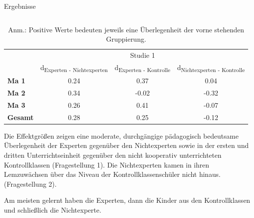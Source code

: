 \documentclass[final]{beamer}
\newlength{\onecolwid}
\newlength{\twocolwid}
\begin{document}
\begin{frame}[t]
\begin{columns}[t]
\begin{column}{\twocolwid}
\begin{block}{Ergebnisse}
\begin{columns}[t,totalwidth=\twocolwid] %
\begin{column}{\onecolwid} %
\begin{table}
\begin{tabular}{lccc}
 & \multicolumn{3}{c}{Studie 1} \\
\cmidrule{2-4}
 & d\textsubscript{Experten - Nichtexperten} & d\textsubscript{Experten - Kontrolle} & d\textsubscript{Nichtexperten - Kontrolle} \\
\midrule 
\textbf{Ma 1} & 0.24 & 0.37 & 0.04 \\
\textbf{Ma 2} & 0.34 & -0.02 & -0.32 \\
\textbf{Ma 3} & 0.26 & 0.41 & -0.07 \\
\midrule 
\textbf{Gesamt} & 0.28 & 0.25 & -0.12 \\
\bottomrule
\end{tabular}
{\caption*{Anm.: Positive Werte bedeuten jeweils eine Überlegenheit der vorne stehenden Gruppierung.}}
\end{table}

\justifying
Die Effektgrößen zeigen eine moderate, durchgängige pädagogisch bedeutsame Überlegenheit der Experten gegenüber den Nichtexperten sowie in der ersten und dritten Unterrichtseinheit gegenüber den nicht kooperativ unterrichteten Kontrollklassen (Fragestellung 1). Die Nichtexperten kamen in ihren Lemzuwächsen über das Niveau der Kontrollklassenschüler nicht hinaus. (Fragestellung 2). 

Am meisten gelernt haben die Experten, dann die Kinder aus den Kontrollklassen und schließlich die Nichtexperte.

\end{column} %



\end{columns}
\end{block}
\end{column}
\end{columns}
\end{frame}
\end{document}
